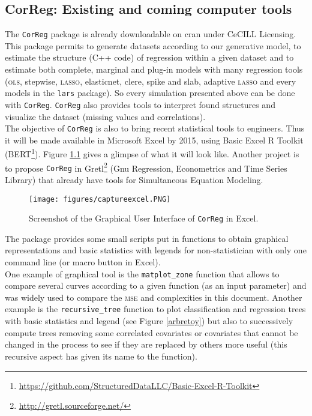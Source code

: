 \documentclass[12pt,a4paper]{report}
\begin{document}
\begin{appendices}
	\newpage
\chapter{CorReg: Existing and coming computer tools}	
	
		The {\tt CorReg} package is already downloadable on {\sc cran} under CeCILL Licensing. This package permits to generate datasets according to our generative model, to estimate the structure (C++ code) of regression within a given dataset and to estimate both complete, marginal and plug-in models with many regression tools (\textsc{ols}, stepwise, \textsc{lasso}, elasticnet, clere, spike and slab, adaptive \textsc{lasso} and every models in the {\tt lars} package). So every simulation presented above can be done with {\tt CorReg}.
	{\tt CorReg} also provides tools to interpret found structures and visualize the dataset (missing values and correlations). \\%
	The objective of {\tt CorReg} is also to bring recent statistical tools to engineers. Thus it will be made available in Microsoft Excel by 2015, using Basic Excel R Toolkit (BERT\footnote{\url{https://github.com/StructuredDataLLC/Basic-Excel-R-Toolkit}}). Figure \ref{captureexcel} gives a glimpse of what it will look like. Another project is to propose {\tt CorReg} in Gretl\footnote{\url{http://gretl.sourceforge.net/}} (Gnu Regression, Econometrics and Time Series Library) that already have tools for Simultaneous Equation Modeling.\\
	
	
\begin{figure}
\centering
\texttt{[image: figures/captureexcel.PNG]} 
	\caption{Screenshot of the Graphical User Interface of {\tt CorReg} in Excel.}\label{captureexcel}
\end{figure}		
	The package provides some small scripts put in functions to obtain graphical representations and basic statistics with legends for non-statistician with only one command line (or macro button in Excel).\\
	 One example of graphical tool is the {\tt matplot\_zone} function that allows to compare several curves according to a given function (as an input parameter) and was widely used to compare the \textsc{mse} and complexities in this document. Another example is the {\tt recursive\_tree} function to plot classification and regression trees with basic statistics and legend (see Figure \ref{arbretoy}) but also to successively compute trees removing some correlated covariates or covariates that cannot be changed in the process to see if they are replaced by others more useful (this recursive aspect has given its name to the function).\\
	 

\end{appendices}
\end{document}
